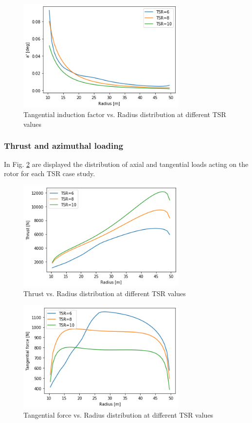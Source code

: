 \begin{figure}[htbp]
\includegraphics[width=0.75\textwidth]{./img/ap_plt_alligned.png}
\caption{Tangential induction factor vs. Radius distribution at different TSR values}
\centering
\label{ap_alligned}
\end{figure}



\subsubsection{\textbf{Thrust and azimuthal loading} }

In Fig. \ref{thrust_alligned} are displayed the distribution of axial and tangential loads acting on the rotor for each TSR case study. 

\begin{figure}[htbp]
\includegraphics[width=0.75\textwidth]{./img/thrust_plt_alligned.png}
\caption{Thrust vs. Radius distribution at different TSR values}
\centering
\label{thrust_alligned}
\end{figure}

\begin{figure}[htbp]
\includegraphics[width=0.75\textwidth]{./img/tang_plt_alligned.png}
\caption{Tangential force vs. Radius distribution at different TSR values}
\centering
\label{tang_alligned}
\end{figure}

